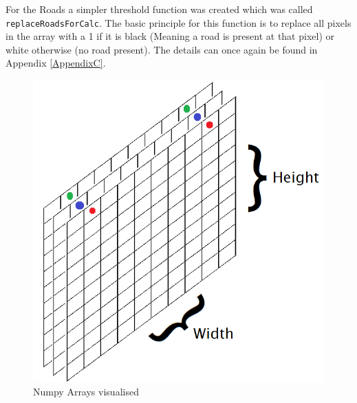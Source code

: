 For the Roads a simpler threshold function was created which was called \texttt{replaceRoadsForCalc}. The basic principle for this function is to replace all pixels in the array with a 1 if it is black (Meaning a road is present at that pixel) or white otherwise (no road present). The details can once again be found in Appendix \ref{AppendixC}.
\begin{figure}[H]
\centering
\includegraphics[width=1\textwidth]{Figures/Chapter3/gridlayers}
\caption{Numpy Arrays visualised}
\label{fig:gridlayers}
\end{figure}


